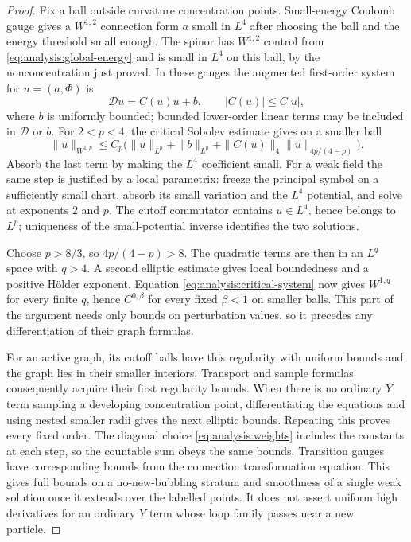 \begin{proof}
Fix a ball outside curvature concentration points.  Small-energy
Coulomb gauge gives a $W^{1,2}$ connection form $a$ small in $L^4$
after choosing the ball and the energy threshold small enough.  The
spinor has $W^{1,2}$ control from
\eqref{eq:analysis:global-energy} and is small in $L^4$ on this ball,
by the nonconcentration just proved.  In these gauges the augmented
first-order system for $u=(a,\Phi)$ is
\begin{equation}\label{eq:analysis:critical-system}
 \mathcal D u=C(u)u+b,
 \qquad |C(u)|\leq C|u|,
\end{equation}
where $b$ is uniformly bounded; bounded lower-order linear terms may
be included in $\mathcal D$ or $b$.  For $2<p<4$, the critical Sobolev
estimate gives on a smaller ball
\[
 \|u\|_{W^{1,p}}
 \leq C_p\bigl(\|u\|_{L^p}+\|b\|_{L^p}
                    +\|C(u)\|_4\|u\|_{4p/(4-p)}\bigr).
\]
Absorb the last term by making the $L^4$ coefficient small.  For a
weak field the same step is justified by a local parametrix: freeze
the principal symbol on a sufficiently small chart, absorb its small
variation and the $L^4$ potential, and solve at exponents $2$ and $p$.
The cutoff commutator contains $u\in L^4$, hence belongs to $L^p$;
uniqueness of the small-potential inverse identifies the two solutions.

Choose $p>8/3$, so $4p/(4-p)>8$.  The quadratic terms are then in an
$L^q$ space with $q>4$.  A second elliptic estimate gives local
boundedness and a positive H\"older exponent.  Equation
\eqref{eq:analysis:critical-system} now gives $W^{1,q}$ for every
finite $q$, hence $C^{0,\beta}$ for every fixed $\beta<1$ on smaller
balls.  This part of the argument needs only bounds on perturbation
values, so it precedes any differentiation of their graph formulas.

For an active graph, its cutoff balls have this regularity with uniform
bounds and the graph lies in their smaller interiors.  Transport and
sample formulas consequently acquire their first regularity bounds.
When there is no ordinary $Y$ term sampling a developing concentration
point, differentiating the equations and using nested smaller radii gives
the next elliptic bounds.  Repeating this proves every fixed order.  The
diagonal choice \eqref{eq:analysis:weights} includes the constants at
each step, so the countable sum obeys the same bounds.  Transition
gauges have corresponding bounds from the connection transformation
equation.  This gives full bounds on a no-new-bubbling stratum and
smoothness of a single weak solution once it extends over the labelled
points.  It does not assert uniform high derivatives for an ordinary
$Y$ term whose loop family passes near a new particle.


\end{proof}
